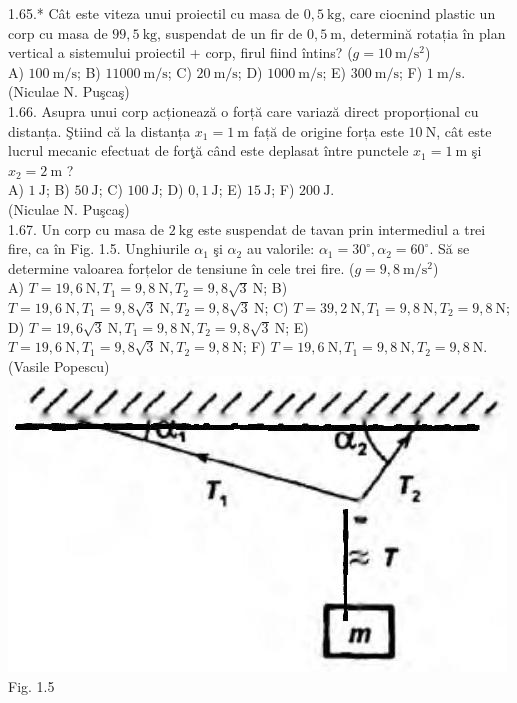 1.65.* Cât este viteza unui proiectil cu masa de $0,5 \mathrm{~kg}$, care ciocnind plastic un corp cu masa de $99,5 \mathrm{~kg}$, suspendat de un fir de $0,5 \mathrm{~m}$, determină rotația în plan vertical a sistemului proiectil + corp, firul fiind întins? ($g=10 \mathrm{~m} / \mathrm{s}^{2}$)\\ A) $100 \mathrm{~m} / \mathrm{s}$; B) $11000 \mathrm{~m} / \mathrm{s}$; C) $20 \mathrm{~m} / \mathrm{s}$; D) $1000 \mathrm{~m} / \mathrm{s}$; E) $300 \mathrm{~m} / \mathrm{s}$; F) $1 \mathrm{~m} / \mathrm{s}$.\\ (Niculae N. Puşcaş)\\

1.66. Asupra unui corp acționează o forță care variază direct proporțional cu distanța. Ştiind că la distanța $x_{1}=1 \mathrm{~m}$ față de origine forța este $10 \mathrm{~N}$, cât este lucrul mecanic efectuat de forţă când este deplasat între punctele $x_{1}=1 \mathrm{~m}$ şi $x_{2}=2 \mathrm{~m}$ ?\\ A) $1 \mathrm{~J}$; B) $50 \mathrm{~J}$; C) $100 \mathrm{~J}$; D) $0,1 \mathrm{~J}$; E) $15 \mathrm{~J}$; F) $200 \mathrm{~J}$.\\ (Niculae N. Puşcaş)\\

1.67. Un corp cu masa de $2 \mathrm{~kg}$ este suspendat de tavan prin intermediul a trei fire, ca în Fig. 1.5. Unghiurile $\alpha_{1}$ şi $\alpha_{2}$ au valorile: $\alpha_{1}=30^{\circ}, \alpha_{2}=60^{\circ}$. Să se determine valoarea forțelor de tensiune în cele trei fire. ($g=9,8 \mathrm{~m} / \mathrm{s}^{2}$)\\ A) $T=19,6 \mathrm{~N}, T_{1}=9,8 \mathrm{~N}, T_{2}=9,8 \sqrt{3} \mathrm{~N}$; B) $T=19,6 \mathrm{~N}, T_{1}=9,8 \sqrt{3} \mathrm{~N}, T_{2}=9,8 \sqrt{3} \mathrm{~N}$; C) $T=39,2 \mathrm{~N}, T_{1}=9,8 \mathrm{~N}, T_{2}=9,8 \mathrm{~N}$; D) $T=19,6 \sqrt{3} \mathrm{~N}, T_{1}=9,8 \mathrm{~N}, T_{2}=9,8 \sqrt{3} \mathrm{~N}$; E) $T=19,6 \mathrm{~N}, T_{1}=9,8 \sqrt{3} \mathrm{~N}, T_{2}=9,8 \mathrm{~N}$; F) $T=19,6 \mathrm{~N}, T_{1}=9,8 \mathrm{~N}, T_{2}=9,8 \mathrm{~N}$.\\ (Vasile Popescu)\\ \includegraphics[width=0.4\linewidth]{images/2025_07_01_5b3ff9fa0d508c8e9f17g-017(1)} Fig. 1.5\\

